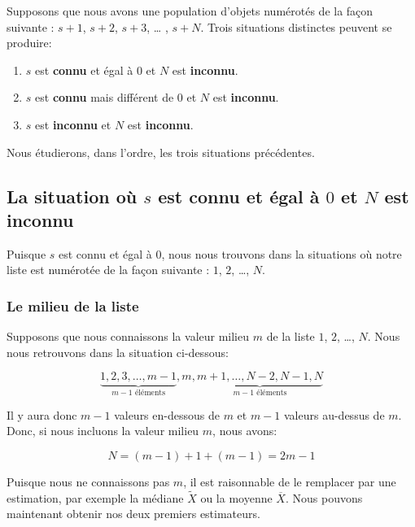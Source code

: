 \documentclass[10pt]{article}
\begin{document}
Supposons que nous avons une population d'objets numérotés de la façon
suivante : \(s+1\), \(s+2\), \(s+3\), \ldots{} , \(s+N\). Trois
situations distinctes peuvent se produire:

\begin{enumerate}
\def\labelenumi{\arabic{enumi}.}
\item
  \(s\) est \textbf{connu} et égal à \(0\) et \(N\) est
  \textbf{inconnu}.
\item
  \(s\) est \textbf{connu} mais différent de \(0\) et \(N\) est
  \textbf{inconnu}.
\item
  \(s\) est \textbf{inconnu} et \(N\) est \textbf{inconnu}.
\end{enumerate}

Nous étudierons, dans l'ordre, les trois situations précédentes.

\hypertarget{la-situation-ou-s-est-connu-et-egal-a-0-et-n-est-inconnu}{%
\subsection{\texorpdfstring{La situation où \(s\) est \textbf{connu} et
égal à \(0\) et \(N\) est
\textbf{inconnu}}{La situation où s est connu et égal à 0 et N est inconnu}}\label{la-situation-ou-s-est-connu-et-egal-a-0-et-n-est-inconnu}}

Puisque \(s\) est connu et égal à \(0\), nous nous trouvons dans la
situations où notre liste est numérotée de la façon suivante : \(1\),
\(2\), \ldots{}, \(N\).

\hypertarget{le-milieu-de-la-liste}{%
\subsubsection{Le milieu de la liste}\label{le-milieu-de-la-liste}}

Supposons que nous connaissons la valeur milieu \(m\) de la liste \(1\),
\(2\), \ldots{}, \(N\). Nous nous retrouvons dans la situation
ci-dessous:

\[\underbrace{1,2,3,\ldots,m-1}_{m-1 \text{ éléments}},m,\underbrace{m+1,\ldots,N-2,N-1,N}_{m-1 \text{ éléments}}\]

Il y aura donc \(m-1\) valeurs en-dessous de \(m\) et \(m-1\) valeurs
au-dessus de \(m\). Donc, si nous incluons la valeur milieu \(m\), nous
avons:

\[N=(m-1)+1+(m-1)=2m-1\]

Puisque nous ne connaissons pas \(m\), il est raisonnable de le
remplacer par une estimation, par exemple la médiane \(\widetilde{X}\)
ou la moyenne \(\overline{X}\). Nous pouvons maintenant obtenir nos deux
premiers estimateurs.
\end{document}
